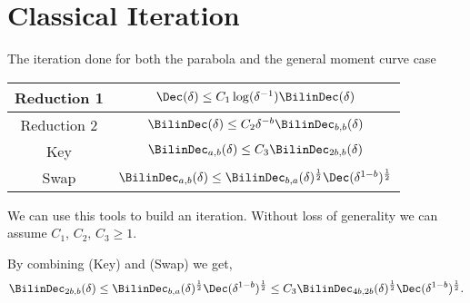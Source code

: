 \section{Classical Iteration}


The iteration done for both the parabola and the general moment curve case 
\begin{center}
\begin{tabular}{|c|c|}
  \hline
  Reduction 1 & $\Dec(\delta)\leq C_1 \log(\delta^{-1})\BilinDec(\delta)$ \\ \hline
  Reduction 2 & $\BilinDec(\delta)\leq C_2 \delta^{-b} \BilinDec_{b,b}(\delta)$ \\ \hline
  Key & $\BilinDec_{a,b}(\delta)\leq C_3\BilinDec_{2b,b}(\delta)$ \\ \hline
  Swap & $\BilinDec_{a,b}(\delta)\leq \BilinDec_{b,a}(\delta)^{\frac{1}{2}}\Dec(\delta^{1-b})^{\frac{1}{2}}$\\ \hline
\end{tabular}
\end{center}
We can use this tools to build an iteration.
Without loss of generality we can assume $C_1,\, C_2,\,C_3 \geq 1$.

By combining (Key) and (Swap) we get,
\begin{equation}
    \BilinDec_{2b,b}(\delta) \leq \BilinDec_{b,a}(\delta)^{\frac{1}{2}}\Dec(\delta^{1-b})^{\frac{1}{2}} \leq C_3 \BilinDec_{4b,2b}(\delta)^{\frac{1}{2}}\Dec(\delta^{1-b})^{\frac{1}{2}}.
\end{equation}

